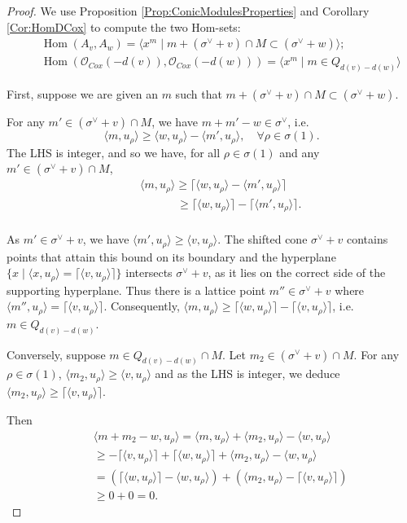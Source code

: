 \documentclass[reqno, 12pt]{amsart}
\theoremstyle{definition}
\numberwithin{equation}{section}
\newcommand{\Hom}{\operatorname{Hom}}
\def\O{\mathcal{O}}
\begin{document}
\begin{proof}
We use Proposition \ref{Prop:ConicModulesProperties} and Corollary \ref{Cor:HomDCox} to compute the two Hom-sets:
\begin{eqnarray*}
&&\Hom(A_v,A_w)=\langle x^m\mid m+(\sigma^\vee+v)\cap M\subset (\sigma^\vee+w)\rangle;\\
&& \Hom(\O_{Cox}(-d(v)),\O_{Cox}(-d(w)))=\langle x^m\mid m\in Q_{d(v)-d(w)}\rangle
\end{eqnarray*}

First, suppose we are given an $m$ such that $m+(\sigma^\vee+v)\cap M\subset(\sigma^\vee+w)$.

For any $m'\in (\sigma^\vee+v)\cap M$, we have $m+m'-w\in \sigma^\vee$, i.e.\[
\langle m,u_\rho\rangle \ge\langle w,u_\rho\rangle-\langle m',u_\rho\rangle,\quad \forall\rho\in\sigma(1).
\]
The LHS is integer, and so we have, for all $\rho\in\sigma(1)$ and any $m'\in (\sigma^\vee+v)\cap M$,
\begin{eqnarray*}
&& \langle m,u_\rho\rangle\ge \lceil\langle w,u_\rho\rangle-\langle m',u_\rho\rangle\rceil\\
&& \quad \quad \quad\ \ge \lceil\langle w,u_\rho\rangle\rceil -\lceil \langle m',u_\rho\rangle\rceil.\\
\end{eqnarray*}

As $m'\in\sigma^\vee+v$, we have $\langle m',u_\rho\rangle\ge \langle v,u_\rho\rangle$. The shifted cone $\sigma^\vee+v$ contains points that attain this bound on its boundary and the hyperplane $\{x\mid\langle x,u_\rho\rangle =\lceil \langle v,u_\rho\rangle\rceil\}$ intersects $\sigma^\vee+v$, as it lies on the correct side of the supporting hyperplane. Thus there is a lattice point $m''\in \sigma^\vee+v$ where $\langle m'',u_\rho\rangle =\lceil\langle v,u_\rho\rangle\rceil$. Consequently, $\langle m,u_\rho\rangle\ge \lceil\langle w,u_\rho\rangle\rceil-\lceil\langle v,u_\rho\rangle\rceil$, i.e. $m\in Q_{d(v)-d(w)}$.

Conversely, suppose $m\in Q_{d(v)-d(w)}\cap M$. Let $m_2\in (\sigma^\vee+v)\cap M$. For any $\rho\in\sigma(1)$, $\langle m_2,u_\rho\rangle \ge \langle v,u_\rho\rangle$ and as the LHS is integer, we deduce $\langle m_2,u_\rho\rangle \ge \lceil\langle v,u_\rho\rangle\rceil$.

Then \begin{eqnarray*}
   && \langle m+m_2-w,u_\rho\rangle=\langle m,u_\rho\rangle +\langle m_2,u_\rho\rangle -\langle w,u_\rho\rangle\\
   && \ge -\lceil\langle v,u_\rho\rangle\rceil +\lceil\langle w,u_\rho\rangle\rceil +\langle m_2,u_\rho\rangle-\langle w,u_\rho\rangle\\
   &&=\left(\lceil \langle w,u_\rho\rangle \rceil-\langle w,u_\rho\rangle\right)+\left(\langle m_2,u_\rho\rangle-\lceil \langle v,u_\rho\rangle\rceil\right)\\
   && \ge 0+0=0.\;
\end{eqnarray*}


\end{proof}
\end{document}
